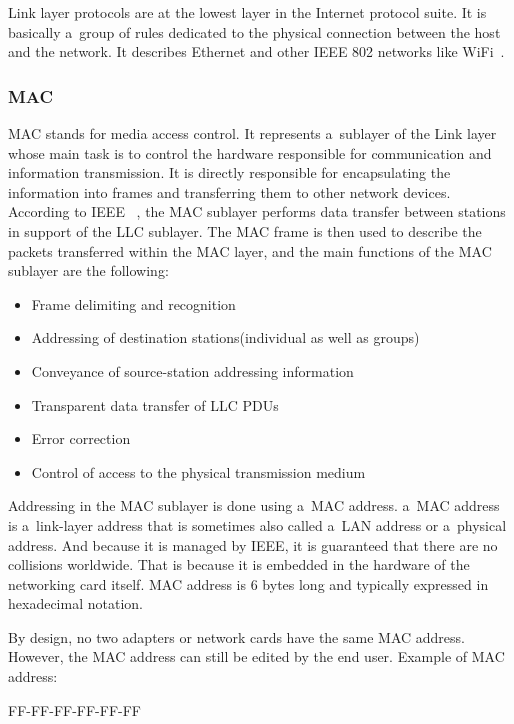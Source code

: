 \documentclass[
  printed,     %
  color,       %
  oneside,     %
  nosansbold,  %
  nocolorbold, %
  nolof,         %
  nolot,         %
]{fithesis4}
\begin{document}
Link layer protocols are at the lowest layer in the Internet protocol suite. It is basically a~group of rules dedicated to the physical connection between the host and the network. It describes Ethernet and other IEEE 802 networks like WiFi~\cite{10.5555/2584507}.

\subsubsection{MAC}
\label{chap:mac}
MAC stands for media access control. It represents a~sublayer of the Link layer whose main task is to control the hardware responsible for communication and information transmission. It is directly responsible for encapsulating the information into frames and transferring them to other network devices. According to IEEE ~\cite{IEEEStd80:online}, the MAC sublayer performs data transfer between stations in support of the LLC sublayer. The MAC frame is then used to describe the packets transferred within the MAC layer, and the main functions of the MAC sublayer are the following:

\begin{itemize}[noitemsep,topsep=0pt]
    \item Frame delimiting and recognition
    \item Addressing of destination stations(individual as well as groups)
    \item Conveyance of source-station addressing information
    \item Transparent data transfer of LLC PDUs
    \item Error correction
    \item Control of access to the physical transmission medium
\end{itemize}

\bigskip
Addressing in the MAC sublayer is done using a~MAC address. a~MAC address is a~link-layer address that is sometimes also called a~LAN address or a~physical address. And because it is managed by IEEE, it is guaranteed that there are no collisions worldwide. That is because it is embedded in the hardware of the networking card itself. MAC address is 6 bytes long and typically expressed in hexadecimal notation.

By design, no two adapters or network cards have the same MAC address. However, the MAC address can still be edited by the end user. Example of MAC address:

\begin{center}
    FF-FF-FF-FF-FF-FF
\end{center}
\end{document}
